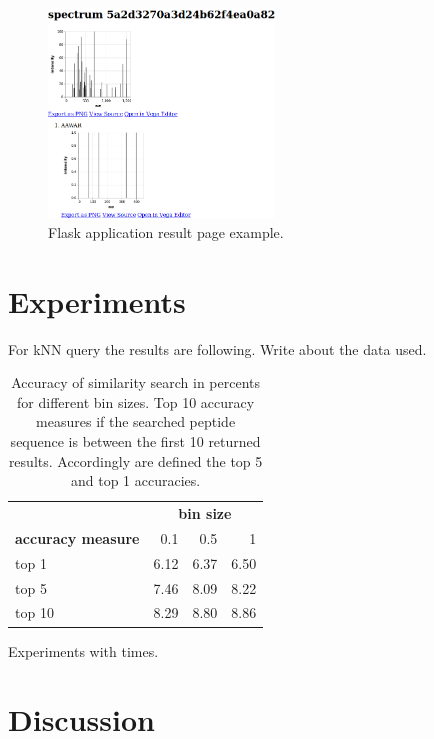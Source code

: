 \documentclass[a4paper,10pt,twocolumn]{article}
\begin{document}
\begin{figure}[H]
    \begin{center}
        \includegraphics[width=6cm]{img/output-sample}
    \end{center}
    \caption{Flask application result page example.}
    \label{fig:sample}
\end{figure}

\section{Experiments}

For kNN query the results are following. Write about the data used.

\begin{table}[H]
    \begin{center}
        \label{table:TODO}
        \begin{tabular}{l|rrr}
            & \multicolumn{3}{c}{\textbf{bin size}} \\
            \textbf{accuracy measure} & 0.1 & 0.5 & 1 \\
            \hline
            top 1 & 6.12 & 6.37 & 6.50 \\
            top 5 & 7.46 & 8.09 & 8.22 \\
            top 10 & 8.29 & 8.80 & 8.86 \\
        \end{tabular}
        \caption{
            Accuracy of similarity search in percents for different bin sizes.
            Top 10 accuracy measures if the searched peptide sequence is between
            the first 10 returned results. Accordingly are defined the top 5
            and top 1 accuracies.
        }
    \end{center}
\end{table}

Experiments with times.

\section{Discussion}
\end{document}
